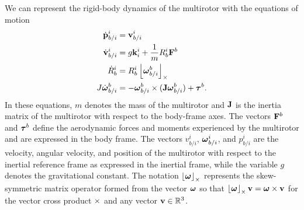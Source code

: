 We can represent the rigid-body dynamics of the multirotor with the equations of motion
\begin{align*}
	\dot{\mathbf{p}}_{b/i}^i &= \mathbf{v}_{b/i}^i \\
	\dot{\mathbf{v}}_{b/i}^i &= g \mathbf{k}_i^i + \frac{1}{m} R_b^i \mathbf{F}^b \\
	\dot{R}_b^i &= R_b^i \left\lfloor\boldsymbol{\omega}_{b/i}^b\right\rfloor_{\times} \\
	J\dot{\boldsymbol{\omega}}_{b/i}^b &= -\boldsymbol{\omega}_{b/i}^b \times (\mathbf{J}\boldsymbol{\omega}_{b/i}^b) + \boldsymbol{\tau}^b.
\end{align*}
%
In these equations, $m$ denotes the mass of the multirotor and $\mathbf{J}$ is the inertia matrix of the multirotor with respect to the body-frame axes. The vectors $\mathbf{F}^b$ and $\boldsymbol{\tau}^b$ define the aerodynamic forces and moments experienced by the multirotor and are expressed in the body frame. The vectors $v_{b/i}^i$, $\boldsymbol{\omega}_{b/i}^i$, and $p_{b/i}^i$ are the velocity, angular velocity, and position of the multirotor with respect to the inertial reference frame as expressed in the inertial frame, while the variable $g$ denotes the gravitational constant. The notation $\left\lfloor\boldsymbol{\omega}\right\rfloor_{\times}$ represents the skew-symmetric matrix operator formed from the vector $\boldsymbol{\omega}$ so that $\left\lfloor\boldsymbol{\omega}\right\rfloor_{\times} \mathbf{v} = \boldsymbol{\omega} \times \mathbf{v}$ for the vector cross product $\times$ and any vector $\mathbf{v} \in \mathbb{R}^3$.



